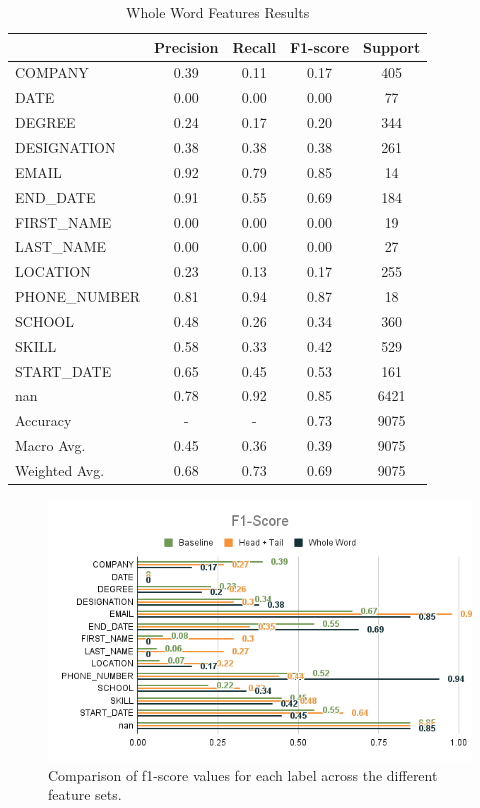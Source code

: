 \documentclass[a4paper, conference]{ieeeconf}
\begin{document}
  \begin{table}[ht!]
    \centering
    \begin{tabular}{|l|c|c|c|c|}
         \hline
             & Precision & Recall & F1-score & Support \\
         \hline
     COMPANY & 0.39 & 0.11 & 0.17 &  405 \\
        DATE & 0.00 & 0.00 & 0.00 &   77 \\
      DEGREE & 0.24 & 0.17 & 0.20 &  344 \\
 DESIGNATION & 0.38 & 0.38 & 0.38 &  261 \\
       EMAIL & 0.92 & 0.79 & 0.85 &   14 \\
    END\_DATE & 0.91 & 0.55 & 0.69 &  184 \\
  FIRST\_NAME & 0.00 & 0.00 & 0.00 &   19 \\
   LAST\_NAME & 0.00 & 0.00 & 0.00 &   27 \\
    LOCATION & 0.23 & 0.13 & 0.17 &  255 \\
PHONE\_NUMBER & 0.81 & 0.94 & 0.87 &   18 \\
      SCHOOL & 0.48 & 0.26 & 0.34 &  360 \\
       SKILL & 0.58 & 0.33 & 0.42 &  529 \\
  START\_DATE & 0.65 & 0.45 & 0.53 &  161 \\
         nan & 0.78 & 0.92 & 0.85 & 6421 \\
         \hline
    Accuracy &  -  &   -  & 0.73 & 9075 \\
   Macro Avg. & 0.45 & 0.36 & 0.39 & 9075 \\
Weighted Avg. & 0.68 & 0.73 & 0.69 & 9075 \\
         \hline
    \end{tabular}
    \caption{Whole Word Features Results}
    \label{table:6}
  \end{table}

  \begin{figure}[ht!]
    \centering
    \includegraphics[width=\columnwidth]{comparison_chart.png}
    \caption{%
      Comparison of f1-score values for each label across the different feature
      sets.
    }
    \label{figure:2}
  \end{figure}
\end{document}
